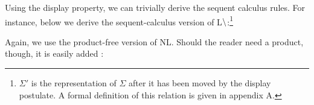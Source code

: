 Using the display property, we can trivially derive the sequent
calculus rules. For instance, below we derive the sequent-calculus
version of L$\mathbin{\backslash}$:\footnote{%
  $\Sigma'$ is the representation of $\Sigma$ after it has been moved
  by the display postulate. A formal definition of this relation is
  given in appendix A.
}
\begin{pfblock}
\end{pfblock}

\vspace*{1\baselineskip}

Again, we use the product-free version of NL. Should the reader need a
product, though, it is easily added \citep{moortgat2012}:
\begin{center}
  \begin{pfbox}
  \end{pfbox}
  \begin{pfbox}
  \end{pfbox}
\end{center}

